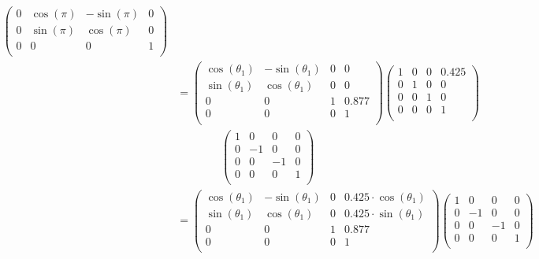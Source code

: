 \documentclass[a4paper,11pt]{article}
\begin{document}
\begin {enumerate}
\begin{enumerate}
\begin{align*}
\begin{pmatrix}
        		0 & \cos(\pi) & -\sin(\pi) & 0\\
        		0 & \sin(\pi) & \cos(\pi) & 0\\
        		0 & 0 & 0 & 1\\
        	\end{pmatrix}\\
        	&= \begin{pmatrix}
        		\cos(\theta_1) & -\sin(\theta_1) & 0 & 0\\
        		\sin(\theta_1) & \cos(\theta_1) & 0 & 0\\
        		0 & 0 & 1 & 0.877\\
        		0 & 0 & 0 & 1\\
        	\end{pmatrix}
        	\begin{pmatrix}
        		1 & 0 & 0 & 0.425\\
        		0 & 1 & 0 & 0\\
        		0 & 0 & 1 & 0\\
        		0 & 0 & 0 & 1\\
        	\end{pmatrix}\\
        	&\qquad\qquad \begin{pmatrix}
        	    1 & 0 & 0 & 0\\
        		0 & -1 & 0 & 0\\
        		0 & 0 & -1 & 0\\
        		0 & 0 & 0 & 1\\
        	\end{pmatrix}\\
        	&= \begin{pmatrix}
        		\cos(\theta_1) & -\sin(\theta_1) & 0 & 0.425 \cdot \cos(\theta_1)\\
        		\sin(\theta_1) & \cos(\theta_1) & 0 & 0.425 \cdot \sin(\theta_1)\\
        		0 & 0 & 1 & 0.877\\
        		0 & 0 & 0 & 1\\
        	\end{pmatrix}
        	\begin{pmatrix}
        	    1 & 0 & 0 & 0\\
        		0 & -1 & 0 & 0\\
        		0 & 0 & -1 & 0\\
        		0 & 0 & 0 & 1\\
        	\end{pmatrix}\\

\end{align*}
\end{enumerate}
\end{enumerate}
\end{document}
